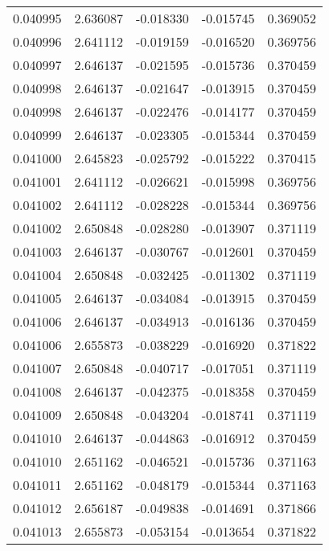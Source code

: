 \begin{tabular}{lrrrr}
0.040995    &  2.636087 & -0.018330 & -0.015745 &             0.369052 \\
0.040996    &  2.641112 & -0.019159 & -0.016520 &             0.369756 \\
0.040997    &  2.646137 & -0.021595 & -0.015736 &             0.370459 \\
0.040998    &  2.646137 & -0.021647 & -0.013915 &             0.370459 \\
0.040998    &  2.646137 & -0.022476 & -0.014177 &             0.370459 \\
0.040999    &  2.646137 & -0.023305 & -0.015344 &             0.370459 \\
0.041000    &  2.645823 & -0.025792 & -0.015222 &             0.370415 \\
0.041001    &  2.641112 & -0.026621 & -0.015998 &             0.369756 \\
0.041002    &  2.641112 & -0.028228 & -0.015344 &             0.369756 \\
0.041002    &  2.650848 & -0.028280 & -0.013907 &             0.371119 \\
0.041003    &  2.646137 & -0.030767 & -0.012601 &             0.370459 \\
0.041004    &  2.650848 & -0.032425 & -0.011302 &             0.371119 \\
0.041005    &  2.646137 & -0.034084 & -0.013915 &             0.370459 \\
0.041006    &  2.646137 & -0.034913 & -0.016136 &             0.370459 \\
0.041006    &  2.655873 & -0.038229 & -0.016920 &             0.371822 \\
0.041007    &  2.650848 & -0.040717 & -0.017051 &             0.371119 \\
0.041008    &  2.646137 & -0.042375 & -0.018358 &             0.370459 \\
0.041009    &  2.650848 & -0.043204 & -0.018741 &             0.371119 \\
0.041010    &  2.646137 & -0.044863 & -0.016912 &             0.370459 \\
0.041010    &  2.651162 & -0.046521 & -0.015736 &             0.371163 \\
0.041011    &  2.651162 & -0.048179 & -0.015344 &             0.371163 \\
0.041012    &  2.656187 & -0.049838 & -0.014691 &             0.371866 \\
0.041013    &  2.655873 & -0.053154 & -0.013654 &             0.371822 \\

\end{tabular}
